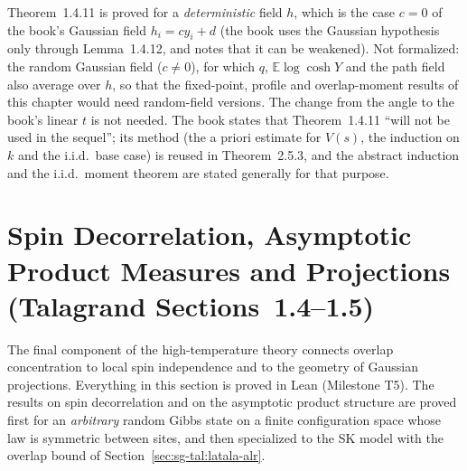 \begin{remark}\label{rem:sg-tal:free-energy-clt-status}
Theorem~1.4.11 is proved for a \emph{deterministic} field $h$, which is the case $c=0$ of the book's Gaussian field $h_i=cy_i+d$ (the book uses the Gaussian hypothesis only through Lemma~1.4.12, and notes that it can be weakened). Not formalized: the random Gaussian field ($c\ne0$), for which $q$, $\mathbb E\log\cosh Y$ and the path field also average over $h$, so that the fixed-point, profile and overlap-moment results of this chapter would need random-field versions. The change from the angle to the book's linear $t$ is not needed. The book states that Theorem~1.4.11 ``will not be used in the sequel''; its method (the a priori estimate for $V(s)$, the induction on $k$ and the i.i.d.\ base case) is reused in Theorem~2.5.3, and the abstract induction and the i.i.d.\ moment theorem are stated generally for that purpose.
\end{remark}

\section{Spin Decorrelation, Asymptotic Product Measures and Projections (Talagrand Sections~1.4--1.5)}\label{sec:sg-tal:decorrelation}

The final component of the high-temperature theory connects overlap concentration to local spin independence and to the geometry of Gaussian projections.
Everything in this section is proved in Lean (Milestone T5).
The results on spin decorrelation and on the asymptotic product structure are proved first for an \emph{arbitrary} random Gibbs state on a finite configuration space whose law is symmetric between sites, and then specialized to the SK model with the overlap bound of Section~\ref{sec:sg-tal:latala-alr}.

